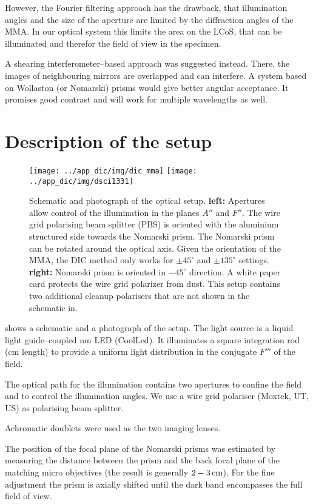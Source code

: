 However, the Fourier filtering approach has the drawback, that
illumination angles and the size of the aperture are limited by the
diffraction angles of the MMA. In our optical system this limits the
area on the LCoS, that can be illuminated and therefor the field of
view in the specimen. 

A shearing interferometer--based approach was suggested instead. There,
the images of neighbouring mirrors are overlapped and can interfere. A
system based on Wollaston (or Nomarski) prisms would give better
angular acceptance. It promises good contrast and will work for
multiple wavelengths as well.
\section{Description of the setup}
\begin{figure}[ht]
  \centering
  \texttt{[image: ../app\_dic/img/dic\_mma]}
  \texttt{[image: ../app\_dic/img/dsci1331]}
  \caption{ Schematic and photograph of the optical setup.  {\bf
      left:} Apertures allow control of the illumination in the planes
    $A''$ and $F''$. The wire grid polarising beam splitter (PBS) is
    oriented with the aluminium structured side towards the Nomarski
    prism. The Nomarski prism can be rotated around the optical
    axis. Given the orientation of the MMA, the DIC method only works
    for $\pm 45^\circ$ and $\pm 135^\circ$ settings.  {\bf right:}
    Nomarski prism is oriented in $-45^\circ$ direction.  A white
    paper card protects the wire grid polarizer from dust.  This setup
    contains two additional cleanup polarisers that are not shown in
    the schematic in.}
  \label{fig:dic_mma}
\end{figure}
 shows a schematic and a photograph of the setup.
The light source is a liquid light guide--coupled \unit[480]{nm} LED
(CoolLed). It illuminates a square integration rod (\unit[10]{cm}
length) to provide a uniform light distribution in the conjugate
$F'''$ of the field.

The optical path for the illumination contains two apertures to
confine the field and to control the illumination angles. We use a
wire grid polariser (Moxtek, UT, US) as polarising beam splitter.

Achromatic doublets were used as the two imaging lenses.

The position of the focal plane of the Nomarski prisms was estimated
by measuring the distance between the prism and the back focal plane
of the matching micro objectives (the result is generally
$\unit[2-3]{cm}$). For the fine adjustment the prism is axially
shifted until the dark band encompasses the full field of view.

